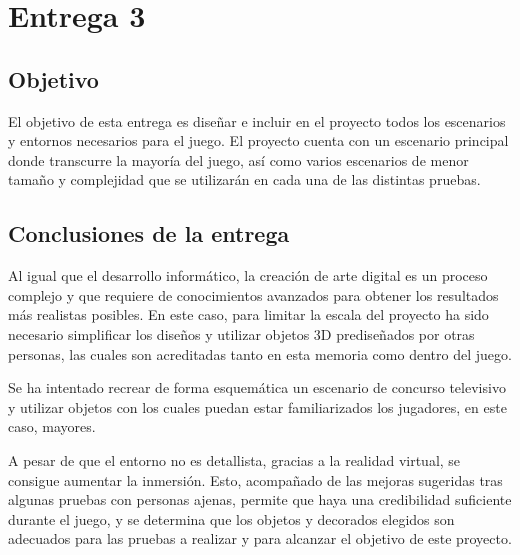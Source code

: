 \section{Entrega 3}


\subsection{Objetivo}


El objetivo de esta entrega es diseñar e incluir en el proyecto todos los escenarios y entornos necesarios para el juego. El proyecto cuenta con un escenario principal donde transcurre la mayoría del juego, así como varios escenarios de menor tamaño y complejidad que se utilizarán en cada una de las distintas pruebas.












\subsection{Conclusiones de la entrega}



Al igual que el desarrollo informático, la creación de arte digital es un proceso complejo y que requiere de conocimientos avanzados para obtener los resultados más realistas posibles. En este caso, para limitar la escala del proyecto ha sido necesario simplificar los diseños y utilizar objetos 3D prediseñados por otras personas, las cuales son acreditadas tanto en esta memoria como dentro del juego.

Se ha intentado recrear de forma esquemática un escenario de concurso televisivo y utilizar objetos con los cuales puedan estar familiarizados los jugadores, en este caso, mayores.

A pesar de que el entorno no es detallista, gracias a la realidad virtual, se consigue aumentar la inmersión. Esto, acompañado de las mejoras sugeridas tras algunas pruebas con personas ajenas, permite que haya una credibilidad suficiente durante el juego, y se determina que los objetos y decorados elegidos son adecuados para las pruebas a realizar y para alcanzar el objetivo de este proyecto.




